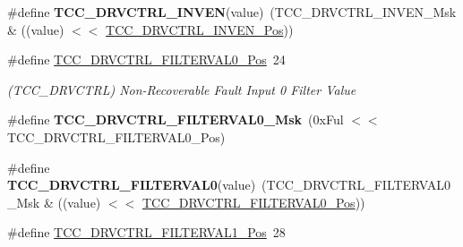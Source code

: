 \begin{DoxyCompactItemize}
\item 
\hypertarget{group___s_a_m_l21___t_c_c_ga407ddc8608ef192b4dfb6974e41a167f}{}\#define {\bfseries T\+C\+C\+\_\+\+D\+R\+V\+C\+T\+R\+L\+\_\+\+I\+N\+V\+E\+N}(value)~(T\+C\+C\+\_\+\+D\+R\+V\+C\+T\+R\+L\+\_\+\+I\+N\+V\+E\+N\+\_\+\+Msk \& ((value) $<$$<$ \hyperlink{group___s_a_m_l21___t_c_c_gac328a23aafdc17cb86096f994378a4c6}{T\+C\+C\+\_\+\+D\+R\+V\+C\+T\+R\+L\+\_\+\+I\+N\+V\+E\+N\+\_\+\+Pos}))\label{group___s_a_m_l21___t_c_c_ga407ddc8608ef192b4dfb6974e41a167f}

\item 
\hypertarget{group___s_a_m_l21___t_c_c_ga84bcc4f0c759227d523c174a182eab15}{}\#define \hyperlink{group___s_a_m_l21___t_c_c_ga84bcc4f0c759227d523c174a182eab15}{T\+C\+C\+\_\+\+D\+R\+V\+C\+T\+R\+L\+\_\+\+F\+I\+L\+T\+E\+R\+V\+A\+L0\+\_\+\+Pos}~24\label{group___s_a_m_l21___t_c_c_ga84bcc4f0c759227d523c174a182eab15}

\begin{DoxyCompactList}\small\item\em (T\+C\+C\+\_\+\+D\+R\+V\+C\+T\+R\+L) Non-\/\+Recoverable Fault Input 0 Filter Value \end{DoxyCompactList}\item 
\hypertarget{group___s_a_m_l21___t_c_c_ga8e016897c7fcbb087d555a3f7b60dbf8}{}\#define {\bfseries T\+C\+C\+\_\+\+D\+R\+V\+C\+T\+R\+L\+\_\+\+F\+I\+L\+T\+E\+R\+V\+A\+L0\+\_\+\+Msk}~(0x\+Ful $<$$<$ T\+C\+C\+\_\+\+D\+R\+V\+C\+T\+R\+L\+\_\+\+F\+I\+L\+T\+E\+R\+V\+A\+L0\+\_\+\+Pos)\label{group___s_a_m_l21___t_c_c_ga8e016897c7fcbb087d555a3f7b60dbf8}

\item 
\hypertarget{group___s_a_m_l21___t_c_c_gaf24936478cb2d75d76bedacc74bc0fff}{}\#define {\bfseries T\+C\+C\+\_\+\+D\+R\+V\+C\+T\+R\+L\+\_\+\+F\+I\+L\+T\+E\+R\+V\+A\+L0}(value)~(T\+C\+C\+\_\+\+D\+R\+V\+C\+T\+R\+L\+\_\+\+F\+I\+L\+T\+E\+R\+V\+A\+L0\+\_\+\+Msk \& ((value) $<$$<$ \hyperlink{group___s_a_m_l21___t_c_c_ga84bcc4f0c759227d523c174a182eab15}{T\+C\+C\+\_\+\+D\+R\+V\+C\+T\+R\+L\+\_\+\+F\+I\+L\+T\+E\+R\+V\+A\+L0\+\_\+\+Pos}))\label{group___s_a_m_l21___t_c_c_gaf24936478cb2d75d76bedacc74bc0fff}

\item 
\hypertarget{group___s_a_m_l21___t_c_c_ga6d71fc13ce573ac216539f160646dff1}{}\#define \hyperlink{group___s_a_m_l21___t_c_c_ga6d71fc13ce573ac216539f160646dff1}{T\+C\+C\+\_\+\+D\+R\+V\+C\+T\+R\+L\+\_\+\+F\+I\+L\+T\+E\+R\+V\+A\+L1\+\_\+\+Pos}~28\label{group___s_a_m_l21___t_c_c_ga6d71fc13ce573ac216539f160646dff1}


\end{DoxyCompactItemize}
